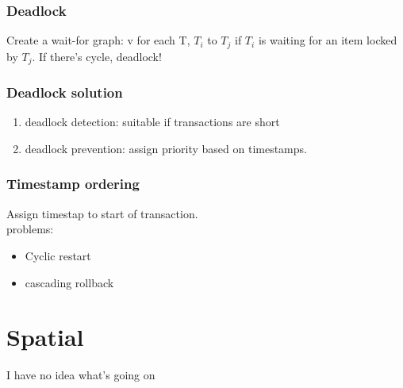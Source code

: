 \documentclass[a4paper]{scrartcl}
\begin{document}
    \subsubsection{Deadlock}
      Create a wait-for graph: v for each T, $T_i$ to $T_j$ if $T_i$ is waiting for an item locked by $T_j$. If there's cycle, deadlock!
    \subsubsection{Deadlock solution}
      \begin{enumerate}
        \item deadlock detection: suitable if transactions are short
        \item deadlock prevention: assign priority based on timestamps.
      \end{enumerate}
    \subsubsection{Timestamp ordering}
      Assign timestap to start of transaction.\\
      
      problems:
      \begin{itemize}
        \item Cyclic restart
        \item cascading rollback
      \end{itemize}
\section{Spatial}
  I have no idea what's going on
\end{document}
